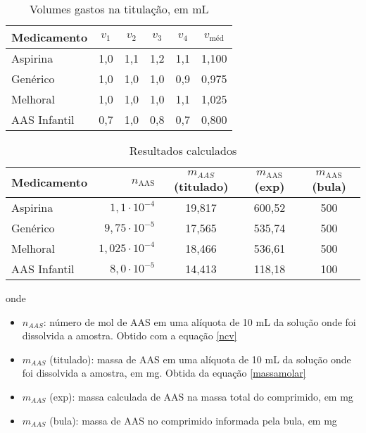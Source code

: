 \begin{table}[H]\label{titulacao_exp1}
    \centering
    \begin{tabular}{l c c c c c}

        \toprule
        Medicamento & $v_1$  & $v_2$ & $v_3$ & $v_4$ & $v_{\textrm{méd}}$ \\
        \midrule
        Aspirina\R     & 1,0 & 1,1 & 1,2 & 1,1 & 1,100 \\
        Genérico     & 1,0 & 1,0 & 1,0 & 0,9 & 0,975  \\
        Melhoral\R     & 1,0 & 1,0 & 1,0 & 1,1 & 1,025\\
        AAS Infantil & 0,7 & 1,0 & 0,8 & 0,7 & 0,800\\
       \bottomrule

    \end{tabular}
    \caption{Volumes gastos na titulação, em mL}
\end{table}

\begin{table}[H]\label{res_calculados_exp1}
    \centering
    \begin{tabular}{l r c c c }
        \toprule
        Medicamento & $n_{\textrm{AAS}}$ &$m_{AAS}$(titulado)& 
        $m_{\textrm{AAS}}$(exp) & $m_{\textrm{AAS}}$ (bula) \\

        \midrule
        Aspirina\R     & $1,1\cdot 10^{-4}$   &19,817 & 600,52 & 500\\
        Genérico     & $9,75\cdot 10^{-5}$  & 17,565 & 535,74 & 500 \\
        Melhoral\R     & $1,025\cdot 10^{-4}$ & 18,466 & 536,61 & 500 \\
        AAS Infantil & $8,0\cdot 10^{-5}$   & 14,413 & 118,18 & 100 \\
        \bottomrule
    \end{tabular}
    \caption{Resultados calculados}
\end{table}

onde
\begin{itemize}
    \item[] $n_{AAS}$: número de mol de AAS em uma alíquota  de 10 mL da solução 
        onde foi dissolvida a amostra. Obtido com a equação \eqref{ncv}
    \item[] $m_{AAS}$ (titulado): massa de AAS em uma alíquota de 10 mL da solução
        onde foi dissolvida a amostra, em mg.
        Obtida da equação \eqref{massamolar}
    \item[]$m_{AAS}$ (exp): massa calculada de AAS na massa total do comprimido, em mg
    \item[] $m_{AAS}$ (bula): massa de AAS no comprimido informada pela bula, em mg
\end{itemize}



